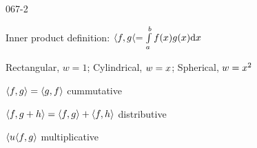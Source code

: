 \begin{mitframe}{067-2}
 \begin{listone}
	\item Inner product definition: $\langle\fug,\grav\langle=\int\limits_{\activity}^{b}\fug(\disp)\grav(\disp)\mathrm{d}\disp$
    	\begin{listtwo}
        	\item Rectangular, $w=1$; Cylindrical, $w=\disp$; Spherical, $w=\disp^2$ 
            \item $\langle\fug,\grav\rangle=\langle\grav,\fug\rangle$ cummutative
            \item $\langle\fug,\grav+\heattranscoeff\rangle=\langle\fug, \grav\rangle+\langle\fug,\heattranscoeff\rangle$ distributive
            \item $\langle\forcepot\langle\fug,\grav\rangle$ multiplicative
        \end{listtwo}
\end{listone}   
\end{mitframe}
